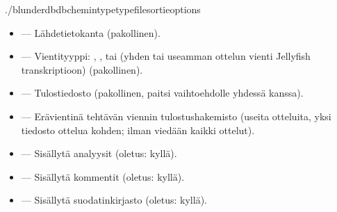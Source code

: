 \documentclass[letterpaper,10pt,finnish]{sphinxmanual}
\begin{document}
\begin{sphinxVerbatim}[commandchars=\\\{\}]
./blunderdb\PYGZhy{}\PYGZhy{}db\PYGZlt{}chemin\PYGZgt{}\PYGZhy{}\PYGZhy{}type\PYGZlt{}type\PYGZgt{}\PYGZhy{}\PYGZhy{}file\PYGZlt{}sortie\PYGZgt{}\PYG{o}{[}options\PYG{o}{]}
\end{sphinxVerbatim}

\sphinxAtStartPar
{}
\begin{itemize}
\item {} 
\sphinxAtStartPar
{} — Lähdetietokanta (pakollinen).

\item {} 
\sphinxAtStartPar
{} — Vientityyppi: , ,  tai  (yhden tai useamman ottelun vienti Jellyfish  \sphinxhyphen{}transkriptioon) (pakollinen).

\item {} 
\sphinxAtStartPar
{} — Tulostiedosto (pakollinen, paitsi  \sphinxhyphen{}vaihtoehdolle yhdessä  kanssa).

\item {} 
\sphinxAtStartPar
{} — Erävientinä tehtävän \sphinxhyphen{}viennin tulostushakemisto (useita otteluita, yksi tiedosto ottelua kohden; ilman  viedään kaikki ottelut).

\item {} 
\sphinxAtStartPar
{} — Sisällytä analyysit (oletus: kyllä).

\item {} 
\sphinxAtStartPar
{} — Sisällytä kommentit (oletus: kyllä).

\item {} 
\sphinxAtStartPar
{} — Sisällytä suodatinkirjasto (oletus: kyllä).


\end{itemize}
\end{document}
